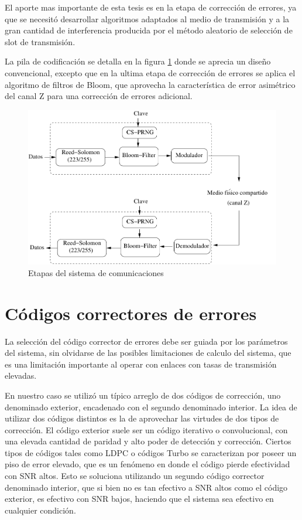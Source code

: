 El aporte mas importante de esta tesis es en la etapa de corrección de errores, ya que se necesitó desarrollar algoritmos adaptados al medio de transmisión y a la gran cantidad de interferencia producida por el método aleatorio de selección de slot de transmisión.

La pila de codificación se detalla en la figura \ref{fig_comstack} donde se aprecia un diseño convencional, excepto que en la ultima etapa de corrección de errores se aplica el algoritmo de filtros de Bloom, que aprovecha la característica de error asimétrico del canal Z para una corrección de errores adicional.

\begin{figure}[t]
\centering
\includegraphics[width=4.5in]{graphs/Soft-stack3}
\caption{Etapas del sistema de comunicaciones}
\label{fig_comstack}
\end{figure}

\section{Códigos correctores de errores}

La selección del código corrector de errores debe ser guiada por los parámetros del sistema, sin olvidarse de las posibles limitaciones de calculo del sistema, que es una limitación importante al operar con enlaces con tasas de transmisión elevadas.

En nuestro caso se utilizó un típico arreglo de dos códigos de corrección, uno denominado exterior, encadenado con el segundo denominado interior.
La idea de utilizar dos códigos distintos es la de aprovechar las virtudes de dos tipos de corrección. El código exterior suele ser un código iterativo o convolucional, con una elevada cantidad de paridad y alto poder de detección y corrección. Ciertos tipos de códigos tales como LDPC o códigos Turbo se caracterizan por poseer un piso de error elevado, que es un fenómeno en donde el código pierde efectividad con SNR altos. Esto se soluciona utilizando un segundo código corrector denominado interior, que si bien no es tan efectivo a SNR altos como el código exterior, es efectivo con SNR bajos, haciendo que el sistema sea efectivo en cualquier condición.

